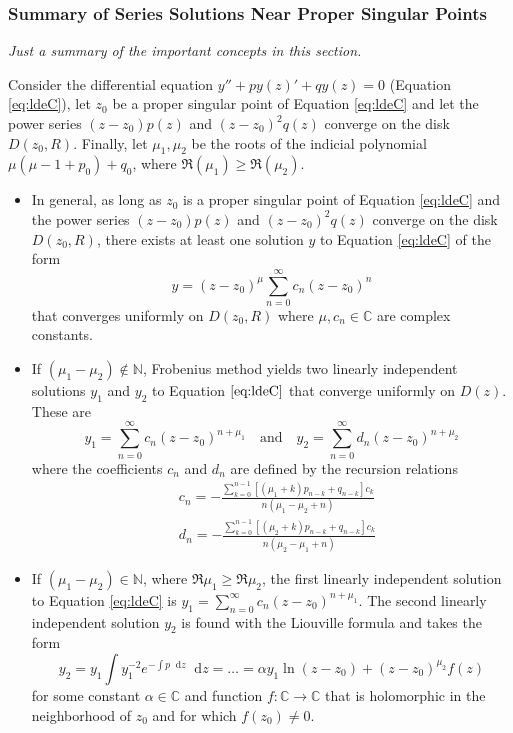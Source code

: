\documentclass[11pt, a4paper]{article}
\newcommand{\question}[1]{\textit{#1}\vspace{2mm}}
\newcommand{\C}{\mathbb{C}} %
\newcommand{\diff}{\mathop{}\!\mathrm{d}} %
\begin{document}
\subsubsection{Summary of Series Solutions Near Proper Singular Points}
\question{Just a summary of the important concepts in this section.}

Consider the differential equation $ y'' + py(z)' + qy(z) = 0 $ (Equation \ref{eq:ldeC}), let $ z_{0} $ be a proper singular point of Equation \ref{eq:ldeC} and let the power series $ (z-z_{0})p(z) $ and $ (z-z_{0})^{2}q(z) $ converge on the disk $ D(z_{0}, R) $. Finally, let $ \mu_{1}, \mu_{2} $ be the roots of the indicial polynomial $ \mu(\mu -1 + p_{0}) + q_{0} $, where $ \Re (\mu_{1}) \geq \Re (\mu_{2})$.



\begin{itemize}
	
	\item In general, as long as $ z_{0} $ is a proper singular point of Equation \ref{eq:ldeC} and the power series $ (z-z_{0})p(z) $ and $ (z-z_{0})^{2}q(z) $ converge on the disk $ D(z_{0}, R) $, there exists at least one solution $ y $ to Equation \ref{eq:ldeC} of the form
	\begin{equation*}
		y = (z - z_{0})^{\mu} \sum_{n=0}^{\infty}c_{n}(z-z_{0})^{n} 
	\end{equation*}
	that converges uniformly on $  D(z_{0}, R) $ where $ \mu, c_{n} \in \C $ are complex constants.
	
	\item If $ (\mu_{1} - \mu_{2}) \notin \mathbb{N} $, Frobenius method yields two linearly independent solutions $ y_{1} $ and $ y_{2} $ to Equation $ \ref{eq:ldeC} $ that converge uniformly on $ D(z) $. These are
	\begin{equation*}
		y_{1} = \sum_{n=0}^{\infty}c_n(z-z_0)^{n+\mu_{1}} \quad \text{and} \quad y_{2} = \sum_{n=0}^{\infty}d_n(z-z_0)^{n+\mu_{2}}
	\end{equation*}
	where the coefficients $ c_{n} $ and $ d_{n} $ are defined by the recursion relations
	\begin{align*}
		&c_{n} = - \frac{\sum_{k=0}^{n-1}\left[(\mu_{1} + k)p_{n-k} + q_{n-k} \right]c_{k}}{n(\mu_{1} - \mu_{2} + n)}\\
		&d_{n} = - \frac{\sum_{k=0}^{n-1}\left[(\mu_{2} + k)p_{n-k} + q_{n-k} \right]c_{k}}{n(\mu_{2} - \mu_{1} + n)}
	\end{align*}

	\item If $ (\mu_{1} - \mu_{2}) \in \mathbb{N} $, where $ \Re \mu_{1} \geq \Re \mu_{2}$, the first linearly independent solution to Equation \ref{eq:ldeC} is $ \displaystyle{y_{1} = \sum_{n=0}^{\infty}c_n(z-z_0)^{n+\mu_{1}}} $. The second linearly independent solution $ y_{2} $ is found with the Liouville formula and takes the form
	\begin{equation*}
		y_{2} = y_{1}\int y_{1}^{-2} e^{-\int p \diff z} \diff z = \ldots =  \alpha y_{1} \ln (z-z_{0}) + (z-z_{0})^{\mu_{2}}f(z)
	\end{equation*}
	for some constant $ \alpha \in \C $ and function $ f : \C \to \C $ that is holomorphic in the neighborhood of $ z_{0} $ and for which $ f(z_{0}) \neq 0$.
	

\end{itemize}
\end{document}
